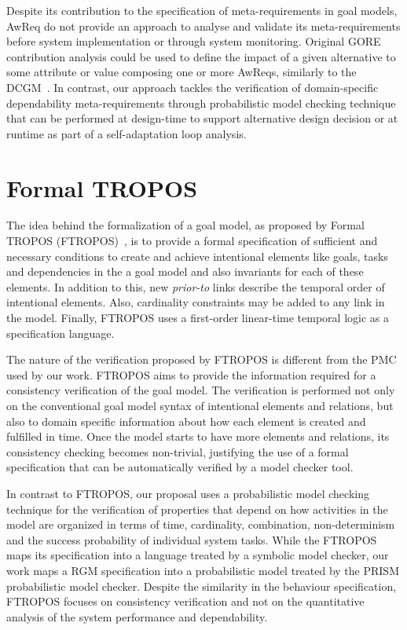 Despite its contribution to the specification of meta-requirements in goal models, AwReq do not provide an approach to analyse and validate its meta-requirements before system implementation or through system monitoring. Original GORE contribution analysis could be used to define the impact of a given alternative to some attribute or value composing one or more AwReqs, similarly to the DCGM~\cite{Mendonca:2014}. In contrast, our approach tackles the verification of domain-specific dependability meta-requirements through probabilistic model checking technique that can be performed at design-time to support alternative design decision or at runtime as part of a self-adaptation loop analysis.

\section{Formal TROPOS}

The idea behind the formalization of a goal model, as proposed by Formal TROPOS (FTROPOS)~\cite{Fuxman:2004}, is to provide a formal specification of sufficient and necessary conditions to create and achieve intentional elements like goals, tasks and dependencies in the a goal model and also invariants for each of these elements. In addition to this, new \textit{prior-to} links describe the temporal order of intentional elements. Also, cardinality constraints may be added to any link in the model. Finally, FTROPOS uses a first-order linear-time temporal logic as a specification language.

The nature of the verification proposed by FTROPOS is different from the PMC used by our work. FTROPOS aims to provide the information required for a consistency verification of the goal model. The verification is performed not only on the  conventional goal model syntax of intentional elements and relations, but also to domain specific information about how each element is created and fulfilled in time. Once the model starts to have more elements and relations, its consistency checking becomes non-trivial, justifying the use of a formal specification that can be automatically verified by a model checker tool. 
	

In contrast to FTROPOS, our proposal uses a probabilistic model checking technique for the verification of properties that depend on how activities in the model are organized in terms of time, cardinality, combination, non-determinism and the success probability of individual system tasks. While the FTROPOS maps its specification into a language treated by a symbolic model checker, our work maps a RGM specification into a probabilistic model treated by the PRISM probabilistic model checker. Despite the similarity in the behaviour specification, FTROPOS focuses on consistency verification and not on the quantitative analysis of the system performance and dependability.


